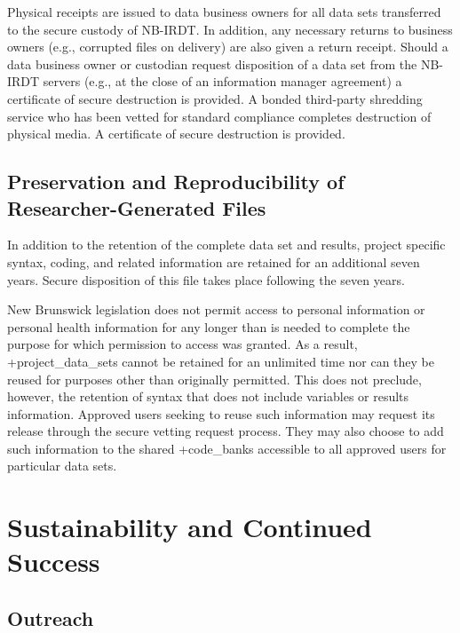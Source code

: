 \documentclass[
]{book}
\begin{document}
Physical receipts are issued to data business owners for all data sets transferred to the secure custody of NB-IRDT. In addition, any necessary returns to business owners (e.g., corrupted files on delivery) are also given a return receipt. Should a data business owner or custodian request disposition of a data set from the NB-IRDT servers (e.g., at the close of an information manager agreement) a certificate of secure destruction is provided. A bonded third-party shredding service who has been vetted for standard compliance completes destruction of physical media. A certificate of secure destruction is provided.

\hypertarget{preservation-and-reproducibility-of-researcher-generated-files-1}{%
\subsection{Preservation and Reproducibility of Researcher-Generated Files}\label{preservation-and-reproducibility-of-researcher-generated-files-1}}

In addition to the retention of the complete data set and results, project specific syntax, coding, and related information are retained for an additional seven years. Secure disposition of this file takes place following the seven years.

New Brunswick legislation does not permit access to personal information or personal health information for any longer than is needed to complete the purpose for which permission to access was granted. As a result, +project\_data\_sets\textbar{} cannot be retained for an unlimited time nor can they be reused for purposes other than originally permitted. This does not preclude, however, the retention of syntax that does not include variables or results information. Approved users seeking to reuse such information may request its release through the secure vetting request process. They may also choose to add such information to the shared +code\_banks\textbar{} accessible to all approved users for particular data sets.

\hypertarget{sustainability-and-continued-success-2}{%
\section{Sustainability and Continued Success}\label{sustainability-and-continued-success-2}}

\hypertarget{outreach-2}{%
\subsection{Outreach}\label{outreach-2}}
\end{document}
